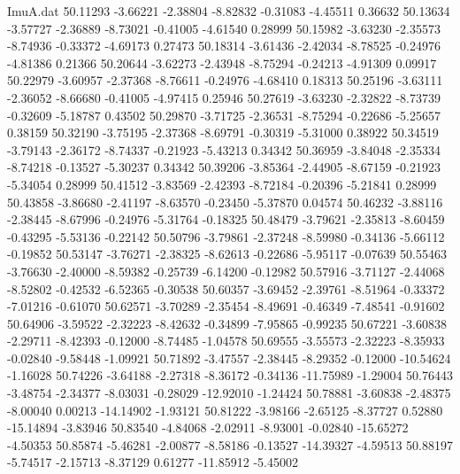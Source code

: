 \begin{filecontents}{ImuA.dat}
  50.11293   -3.66221   -2.38804   -8.82832   -0.31083   -4.45511    0.36632
  50.13634   -3.57727   -2.36889   -8.73021   -0.41005   -4.61540    0.28999
  50.15982   -3.63230   -2.35573   -8.74936   -0.33372   -4.69173    0.27473
  50.18314   -3.61436   -2.42034   -8.78525   -0.24976   -4.81386    0.21366
  50.20644   -3.62273   -2.43948   -8.75294   -0.24213   -4.91309    0.09917
  50.22979   -3.60957   -2.37368   -8.76611   -0.24976   -4.68410    0.18313
  50.25196   -3.63111   -2.36052   -8.66680   -0.41005   -4.97415    0.25946
  50.27619   -3.63230   -2.32822   -8.73739   -0.32609   -5.18787    0.43502
  50.29870   -3.71725   -2.36531   -8.75294   -0.22686   -5.25657    0.38159
  50.32190   -3.75195   -2.37368   -8.69791   -0.30319   -5.31000    0.38922
  50.34519   -3.79143   -2.36172   -8.74337   -0.21923   -5.43213    0.34342
  50.36959   -3.84048   -2.35334   -8.74218   -0.13527   -5.30237    0.34342
  50.39206   -3.85364   -2.44905   -8.67159   -0.21923   -5.34054    0.28999
  50.41512   -3.83569   -2.42393   -8.72184   -0.20396   -5.21841    0.28999
  50.43858   -3.86680   -2.41197   -8.63570   -0.23450   -5.37870    0.04574
  50.46232   -3.88116   -2.38445   -8.67996   -0.24976   -5.31764   -0.18325
  50.48479   -3.79621   -2.35813   -8.60459   -0.43295   -5.53136   -0.22142
  50.50796   -3.79861   -2.37248   -8.59980   -0.34136   -5.66112   -0.19852
  50.53147   -3.76271   -2.38325   -8.62613   -0.22686   -5.95117   -0.07639
  50.55463   -3.76630   -2.40000   -8.59382   -0.25739   -6.14200   -0.12982
  50.57916   -3.71127   -2.44068   -8.52802   -0.42532   -6.52365   -0.30538
  50.60357   -3.69452   -2.39761   -8.51964   -0.33372   -7.01216   -0.61070
  50.62571   -3.70289   -2.35454   -8.49691   -0.46349   -7.48541   -0.91602
  50.64906   -3.59522   -2.32223   -8.42632   -0.34899   -7.95865   -0.99235
  50.67221   -3.60838   -2.29711   -8.42393   -0.12000   -8.74485   -1.04578
  50.69555   -3.55573   -2.32223   -8.35933   -0.02840   -9.58448   -1.09921
  50.71892   -3.47557   -2.38445   -8.29352   -0.12000  -10.54624   -1.16028
  50.74226   -3.64188   -2.27318   -8.36172   -0.34136  -11.75989   -1.29004
  50.76443   -3.48754   -2.34377   -8.03031   -0.28029  -12.92010   -1.24424
  50.78881   -3.60838   -2.48375   -8.00040    0.00213  -14.14902   -1.93121
  50.81222   -3.98166   -2.65125   -8.37727    0.52880  -15.14894   -3.83946
  50.83540   -4.84068   -2.02911   -8.93001   -0.02840  -15.65272   -4.50353
  50.85874   -5.46281   -2.00877   -8.58186   -0.13527  -14.39327   -4.59513
  50.88197   -5.74517   -2.15713   -8.37129    0.61277  -11.85912   -5.45002

\end{filecontents}
